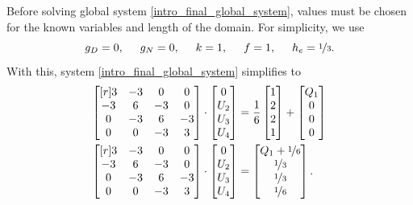 Before solving global system \cref{intro_final_global_system}, values must be chosen for the known variables and length of the domain.  For simplicity, we use
$$g_D = 0, \hspace{5mm} g_N = 0, \hspace{5mm} k = 1, \hspace{5mm} f=1, \hspace{5mm} h_e = \nicefrac{1}{3}.$$
With this, system \cref{intro_final_global_system} simplifies to
\begin{align}
  \begin{bmatrix}[r]
     3 & -3 &  0 &  0 \\
    -3 &  6 & -3 &  0 \\
     0 & -3 &  6 & -3 \\
     0 &  0 & -3 &  3 \\
  \end{bmatrix} \cdot
  \begin{bmatrix} 0   \\ U_2 \\ U_3 \\ U_4 \end{bmatrix} &=
  \frac{1}{6}
  \begin{bmatrix} 1   \\ 2   \\ 2   \\ 1   \end{bmatrix} +
  \begin{bmatrix} Q_1 \\ 0   \\ 0   \\ 0   \end{bmatrix} \notag \\
  \label{intro_full_matrix}
  \begin{bmatrix}[r]
     3 & -3 &  0 &  0 \\
    -3 &  6 & -3 &  0 \\
     0 & -3 &  6 & -3 \\
     0 &  0 & -3 &  3 \\
  \end{bmatrix} \cdot
  \begin{bmatrix} 0   \\ U_2 \\ U_3 \\ U_4 \end{bmatrix} &=
  \begin{bmatrix} Q_1 + \nicefrac{1}{6} \\ \nicefrac{1}{3} \\ \nicefrac{1}{3} \\ \nicefrac{1}{6} \end{bmatrix}.
\end{align}

